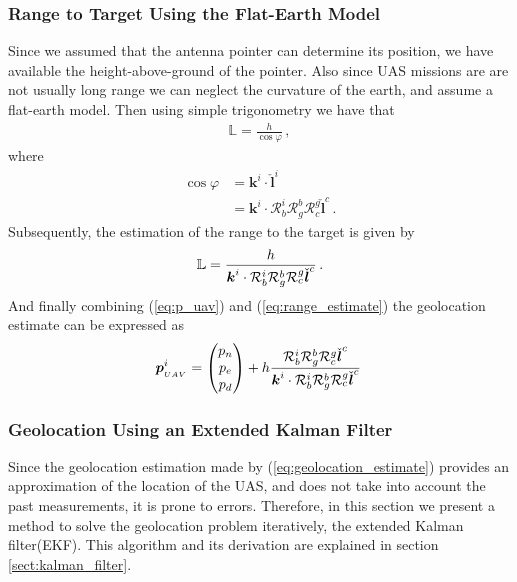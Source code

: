 \subsubsection{Range to Target Using the Flat-Earth Model}
Since we assumed that the antenna pointer can determine its position, we have available the height-above-ground of the pointer. Also since UAS missions are are not usually long range we can neglect the curvature of the earth, and assume a flat-earth model. Then using simple trigonometry we have that
\begin{align*}
\mathbb{L}=\frac{h}{\cos\varphi}\,,
\end{align*} 
where
\begin{align*}
\cos\varphi&=\boldsymbol{k}^i\cdot\check{\boldsymbol{l}}^i \\
		   &=\boldsymbol{k}^i\cdot\mathcal{R}_b^i\mathcal{R}_g^b\mathcal{R}_c^g\check{\boldsymbol{l}}^c\,.
\end{align*}
Subsequently, the estimation of the range to the target is given by
\begin{align}{\label{eq:range_estimate}}
\mathbb{L}=\frac{h}{\boldsymbol{k}^i\cdot\mathcal{R}_b^i\mathcal{R}_g^b\mathcal{R}_c^g\check{\boldsymbol{l}}^c}\,.
\end{align}
And finally combining (\ref{eq:p_uav}) and (\ref{eq:range_estimate}) the geolocation estimate can be expressed as
\begin{align}{\label{eq:geolocation_estimate}}
\boldsymbol{p}_{_{UAV}}^i=
\begin{pmatrix}
p_n \\
p_e \\
p_d 
\end{pmatrix}
+ h \frac{\mathcal{R}_b^i\mathcal{R}_g^b\mathcal{R}_c^g\check{\boldsymbol{l}}^c}{\boldsymbol{k}^i\cdot\mathcal{R}_b^i\mathcal{R}_g^b\mathcal{R}_c^g\check{\boldsymbol{l}}^c}\,
\end{align}
\subsubsection{Geolocation Using an Extended Kalman Filter}{\label{sub:geolocatoin_with_EKF}}
Since the geolocation estimation made by (\ref{eq:geolocation_estimate}) provides an approximation of the location of the UAS, and does not take into account the past measurements, it is prone to errors. Therefore, in this section we present a method to solve the geolocation problem iteratively, the extended Kalman filter(EKF). This algorithm and its derivation are explained in section \ref{sect:kalman_filter}.

